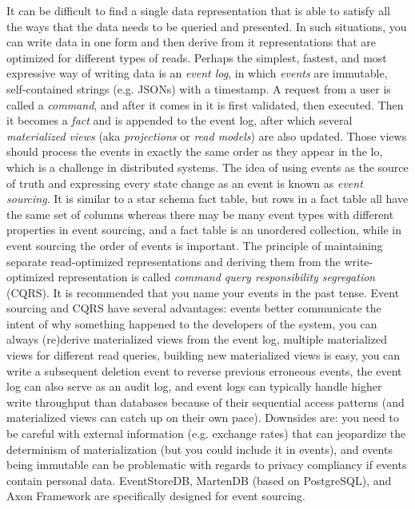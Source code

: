 \documentclass[table, xcdraw]{article}%
\begin{document}
It can be difficult to find a single data representation that is able to satisfy all the ways that the data needs to be queried and
presented. In such situations, you can write data in one form and then derive from it representations that are optimized for different types of reads. Perhaps the simplest, fastest, and most expressive way of writing data is an \textit{event log}, in which \textit{events} are immutable, self-contained strings (e.g. JSONs) with a timestamp. A request from a user is called a \textit{command}, and after it comes in it is first validated, then executed. Then it becomes a \textit{fact} and is appended to the event log, after which several \textit{materialized views} (aka \textit{projections} or \textit{read models}) are also updated. Those views should process the events in exactly the same order as they appear in the lo, which is a challenge in distributed systems. The idea of using events as the source of truth and expressing every state change as an event is known as \textit{event sourcing}. It is similar to a star schema fact table, but rows in a fact table all have the same set of columns whereas there may be many event types with different properties in event sourcing, and a fact table is an unordered collection, while in event sourcing the order of events is important. The principle of maintaining separate read-optimized representations and deriving them from the write-optimized representation is called \textit{command query responsibility segregation} (CQRS). It is recommended that you name your events in the past tense. Event sourcing and CQRS have several advantages: events better communicate the intent of why something happened to the developers of the system, you can always (re)derive materialized views from the event log, multiple materialized views for different read queries, building new materialized views is easy, you can write a subsequent deletion event to reverse previous erroneous events, the event log can also serve as an audit log, and event logs can typically handle higher write throughput than databases because of their sequential access patterns (and materialized views can catch up on their own pace). Downsides are: you need to be careful with external information (e.g. exchange rates) that can jeopardize the determinism of materialization (but you could include it in events), and events being immutable can be problematic with regards to privacy compliancy if events contain personal data. EventStoreDB, MartenDB (based on PostgreSQL), and Axon Framework are specifically designed for event sourcing.
\end{document}
